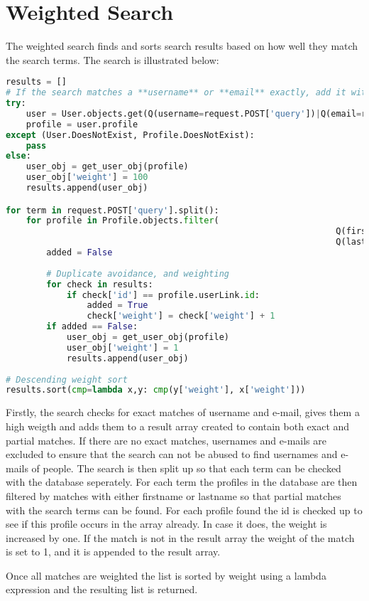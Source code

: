 \section{Weighted Search}
The weighted search finds and sorts search results based on how well they match the search terms. 
The search is illustrated below:
\begin{lstlisting}[language=Python,caption=Weighting of the search results]
results = []
# If the search matches a **username** or **email** exactly, add it with high weight, else exclude usernames
try:
	user = User.objects.get(Q(username=request.POST['query'])|Q(email=request.POST['query']))
	profile = user.profile
except (User.DoesNotExist, Profile.DoesNotExist):
	pass
else:
	user_obj = get_user_obj(profile)
	user_obj['weight'] = 100
	results.append(user_obj)

for term in request.POST['query'].split():
	for profile in Profile.objects.filter(
																 Q(firstname__icontains=term)|
																 Q(lastname__icontains=term)):
		added = False
		
		# Duplicate avoidance, and weighting
		for check in results:
			if check['id'] == profile.userLink.id:
				added = True
				check['weight'] = check['weight'] + 1
		if added == False:
			user_obj = get_user_obj(profile)
			user_obj['weight'] = 1
			results.append(user_obj)
					
# Descending weight sort
results.sort(cmp=lambda x,y: cmp(y['weight'], x['weight'])) 
\end{lstlisting}
Firstly, the search checks for exact matches of username and e-mail, gives them a high weigth and adds them to a result array created to contain both exact and partial matches. If there are no exact matches, usernames and e-mails are excluded to ensure that the search can not be abused to find usernames and e-mails of people.
The search is then split up so that each term can be checked with the database seperately. For each term the profiles in the database are then filtered by matches with either firstname or lastname so that partial matches with the search terms can be found. For each profile found the id is checked up to see if this profile occurs in the array already. In case it does, the weight is increased by one. If the match is not in the result array the weight of the match is set to 1, and it is appended to the result array.

Once all matches are weighted the list is sorted by weight using a lambda expression and the resulting list is returned. 